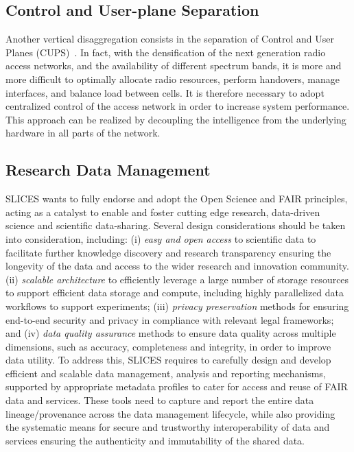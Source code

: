 \subsection{Control and User-plane Separation}
Another vertical disaggregation consists in the separation of Control and User Planes (CUPS)~\cite{cups}. In fact, with the densification of the next generation radio access networks, and the availability of different spectrum bands, it is more and more difficult to optimally allocate radio resources, perform handovers, manage interfaces, and balance load between cells. It is therefore necessary to adopt centralized control of the access network in order to increase system performance. This approach can be realized by decoupling the intelligence from the underlying hardware in all parts of the network.


%	

\subsection{Research Data Management}
SLICES wants to fully endorse and adopt the Open Science and FAIR principles, acting as a catalyst to enable and foster cutting edge research, data-driven science and scientific data-sharing. Several design considerations should be taken into consideration, including: 
(i) \emph{easy and open access} to scientific data to facilitate further knowledge discovery and research transparency ensuring the longevity of the data and access to the wider research and innovation community.
(ii) \emph{scalable architecture} to efficiently leverage a large number of storage resources to  support efficient data storage and compute, including highly parallelized data workflows to support experiments;
(iii) \emph{privacy preservation} methods for ensuring end-to-end security and privacy in compliance with relevant legal frameworks; and 
(iv) \emph{data quality assurance} methods to ensure data quality across multiple dimensions, such as accuracy, completeness and integrity, in order to improve data utility.
To address this, SLICES requires to carefully design and develop efficient and scalable data management, analysis and reporting mechanisms, supported by appropriate metadata profiles to cater for access and reuse of FAIR data and services. These tools need to capture and report the entire data lineage/provenance across the data management lifecycle, while also providing the systematic means for secure and trustworthy interoperability of data and services ensuring the authenticity and immutability of the shared data. 



 